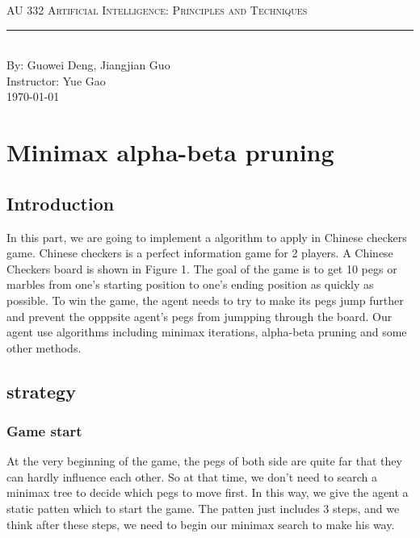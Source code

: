 \documentclass[aps,letterpaper,10pt]{revtex4}
\newcommand{\labtitle}{AU 332 Artificial Intelligence: Principles and Techniques}
\newcommand{\authorname}{Guowei Deng, Jiangjian Guo}
\newcommand{\professor}{Yue Gao}
\begin{document}
\begin{titlepage}
\begin{center}
{\Large \textsc{\labtitle} \\ \vspace{4pt}}
\rule[13pt]{\textwidth}{1pt} \\ \vspace{150pt}
{\large By: \authorname \\ \vspace{10pt}
Instructor: \professor \\ \vspace{10pt}
\today}
\end{center}
\end{titlepage}
\section{Minimax alpha-beta pruning}
\subsection{Introduction}
In this part, we are going to implement a algorithm to apply in Chinese checkers game. Chinese checkers is a perfect information game for 2 players. A Chinese Checkers board is shown in Figure
1. The goal of the game is to get 10 pegs or marbles from one's starting position to one's ending position as
quickly as possible. To win the game, the agent needs to try to make its pegs jump further and prevent the opppsite agent's pegs
from jumpping through the board. Our agent use algorithms including minimax iterations, alpha-beta pruning and some other methods.
\subsection{strategy}
\subsubsection{Game start}
At the very beginning of the game, the pegs of both side are quite far that they can hardly influence each other. So at that 
time, we don't need to search a minimax tree to decide which pegs to move first. In this way, we give the agent a static patten which 
to start the game. The patten just includes 3 steps, and we think after these steps, we need to begin our minimax search to 
make his way. 
\end{document}
